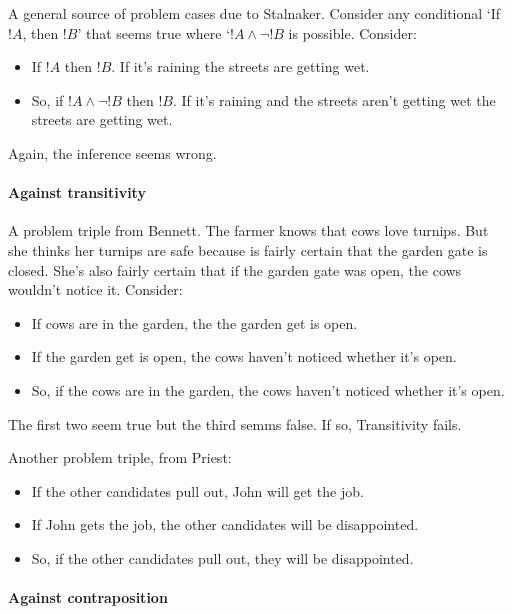 \documentclass[../../../include/open-logic-section]{subfiles}
\begin{document}
A general source of problem cases due to Stalnaker. Consider any conditional `If $!A$, then $!B$' that seems true where `$!A \land \lnot !B$ is possible. Consider: 

\begin{itemize}
	\item If $!A$ then $!B$. If it's raining the streets are getting wet. 
	\item So, if $!A \land \lnot !B$ then $!B$. If it's raining and the streets aren't getting wet the streets are getting wet. 
\end{itemize}

Again, the inference seems wrong.

\paragraph*{Against transitivity}

A problem triple from Bennett. The farmer knows that cows love turnips. But she thinks her turnips are safe because is fairly certain that the garden gate is closed. She's also fairly certain that if the garden gate was open, the cows wouldn't notice it. Consider:

\begin{itemize}
	\item If cows are in the garden, the the garden get is open.
	\item If the garden get is open, the cows haven't noticed whether it's open.
	\item So, if the cows are in the garden, the cows haven't noticed whether it's open.
\end{itemize}

The first two seem true but the third semms false. If so, Transitivity fails. 

Another problem triple, from Priest:

\begin{itemize}
	\item If the other candidates pull out, John will get the job. 
	\item If John gets the job, the other candidates will be disappointed. 
	\item So, if the other candidates pull out, they will be disappointed.
\end{itemize}

\paragraph*{Against contraposition}
\end{document}
